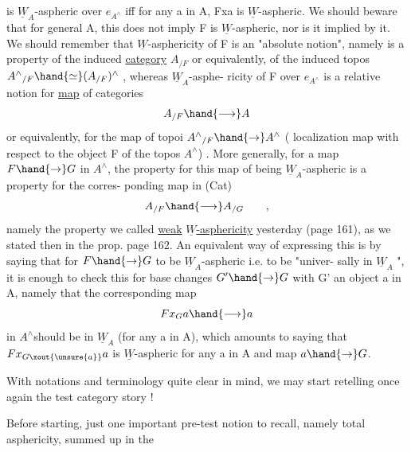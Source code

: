 
is $\underline{W}_A$-aspheric over $e_{A^\wedge}$ iff for any a in A,  Fxa is $\underline{W}$-aspheric.  We
should beware that for general A,  this does not imply F is $\underline{W}$-aspheric,
nor is it implied by it.  We should remember that $\underline{W}$-asphericity of F is
an "absolute notion",  namely is a property of the induced \uline{category} $A_{/F}$
or equivalently,  of the induced topos $A^\wedge{}_{/F} \hand{\simeq} (A_{/F})^\wedge$ ,  whereas $\underline{W}_A$-asphe-%
ricity of F over $e_{A^\wedge}$ is a relative notion for  \uline{map} of categories
\[ A_{/F} \hand{\longrightarrow} A \]
or equivalently,  for the map of topoi  $A^\wedge{}_{/F} \hand{\to} A^\wedge$  ( localization map
with respect to the object F of the topos $A^\wedge$) .  
  More generally,  for a map $F \hand{\to} G$ in $A^\wedge$, the
property for this map of being $\underline{W}_A$-aspheric is a property for the corres-%
ponding map in (Cat)
\[ A_{/F} \hand{\longrightarrow} A_{/G} \qquad , \]
namely the property we called  \uline{weak} \uline{$\underline{W}$-asphericity}  yesterday (page 161),
as we stated then in the prop. page 162.  An equivalent way of expressing
this is by saying that for $F \hand{\to} G$ to be $\underline{W}_A$-aspheric  i.e. to be "univer-%
sally in $\underline{W}_A$ ",  it is enough to check this for base changes  $G' \hand{\to} G$
with G' an object a in A,  namely that the corresponding map
\[ Fx_G a \hand{\longrightarrow} a \]
in $A^\wedge$should be in $\underline{W}_A$ (for any a in A),  which amounts to saying that
$Fx_{G\xout{\unsure{a}}}a$  is $\underline{W}$-aspheric  for any a in A and map $a \hand{\to} G$.

With notations and terminology quite clear in mind,  we may start
retelling once again the test category story !

\noindent\hand{\rule{6em}{.3pt}}\par{} 
Before starting,  just one important pre-test notion to recall,
namely total asphericity,  summed up in the

